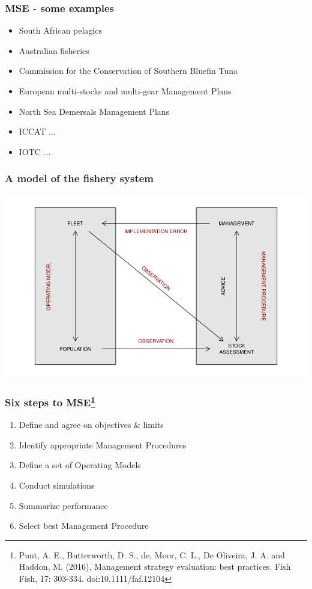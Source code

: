 \documentclass{beamer}
\begin{document}
\begin{frame}
\frametitle{MSE - some examples}

\begin{itemize}	
	\item South African pelagics
	\item Australian fisheries
	\item Commission for the Conservation of Southern Bluefin Tuna
	\item European multi-stocks and multi-gear Management Plans
	\item North Sea Demersals Management Plans
	\item ICCAT ...
	\item IOTC ...
\end{itemize}

\end{frame}

\begin{frame}
\frametitle{A model of the fishery system}

\begin{center}
\includegraphics[height=0.8\textheight]{figs/mse.png}
\end{center}

\end{frame}

\begin{frame}
\frametitle{Six steps to MSE\footnote{Punt, A. E., Butterworth, D. S., de, Moor, C. L., De Oliveira, J. A. and Haddon, M. (2016), Management strategy evaluation: best practices. Fish Fish, 17: 303-334. doi:10.1111/faf.12104}}

\begin{enumerate}	
	\item Define and agree on objectives \& limits
	\item Identify appropriate Management Procedures
	\item Define a set of Operating Models
	\item Conduct simulations
	\item Summarize performance
	\item Select best Management Procedure
\end{enumerate}

\end{frame}
\end{document}
